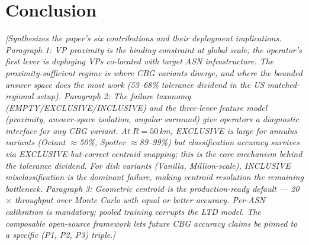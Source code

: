 \section{Conclusion}
\label{sec:conclusion}

\textit{[Synthesizes the paper's six contributions and their deployment implications.
Paragraph 1: VP proximity is the binding constraint at global scale; the operator's first lever is
deploying VPs co-located with target ASN infrastructure. The proximity-sufficient regime is where
CBG variants diverge, and where the bounded answer space does the most work (53--68\% tolerance
dividend in the US matched-regional setup).
Paragraph 2: The failure taxonomy (EMPTY/EXCLUSIVE/INCLUSIVE) and the three-lever feature model
(proximity, answer-space isolation, angular surround) give operators a diagnostic interface for any
CBG variant. At $R = 50$\,km, EXCLUSIVE is large for annulus variants (Octant $\approx$50\%,
Spotter $\approx$89--99\%) but classification accuracy survives via EXCLUSIVE-but-correct centroid
snapping; this is the core mechanism behind the tolerance dividend. For disk variants (Vanilla,
Million-scale), INCLUSIVE misclassification is the dominant failure, making centroid resolution
the remaining bottleneck.
Paragraph 3: Geometric centroid is the production-ready default — 20$\times$ throughput over Monte
Carlo with equal or better accuracy. Per-ASN calibration is mandatory; pooled training corrupts the
LTD model. The composable open-source framework lets future CBG accuracy claims be pinned to a
specific (P1, P2, P3) triple.]}

%
%
%
